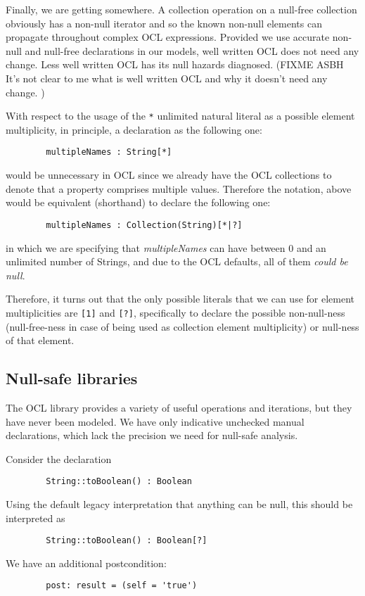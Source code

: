 \documentclass{llncs}
\begin{document}
Finally, we are getting somewhere. A collection operation on a null-free collection obviously has a non-null iterator and so the known non-null elements can propagate throughout complex OCL expressions. Provided we use accurate non-null and null-free declarations in our models, well written OCL does not need any change. Less well written OCL has its null hazards diagnosed. (FIXME ASBH  It's not clear to me what is well written OCL and why it doesn't need any change. )

With respect to the usage of the \verb|*| unlimited natural literal as a possible element multiplicity, in principle, a declaration as the following one:

\begin{verbatim}
        multipleNames : String[*]
\end{verbatim}

would be unnecessary in OCL since we already have the OCL collections to denote that a property comprises multiple values. Therefore the notation, above would be equivalent (shorthand) to declare the following one:

\begin{verbatim}
        multipleNames : Collection(String)[*|?]
\end{verbatim}

in which we are specifying that \textit{multipleNames} can have between 0 and an unlimited number of Strings, and due to the OCL defaults, all of them \textit{could be null}.

Therefore, it turns out that the only possible literals that we can use for element multiplicities are \verb|[1]| and \verb|[?]|, specifically to declare the possible non-null-ness (null-free-ness in case of being used as collection element multiplicity) or null-ness of that element.

\subsection{Null-safe libraries}

The OCL library provides a variety of useful operations and iterations, but they have never been modeled. We have only indicative unchecked manual declarations, which lack the precision we need for null-safe analysis.

Consider the declaration
\begin{verbatim}
        String::toBoolean() : Boolean
\end{verbatim}
Using the default legacy interpretation that anything can be null, this should be interpreted as
\begin{verbatim}
        String::toBoolean() : Boolean[?]
\end{verbatim}
We have an additional postcondition:
\begin{verbatim}
        post: result = (self = 'true')
\end{verbatim}
\end{document}
